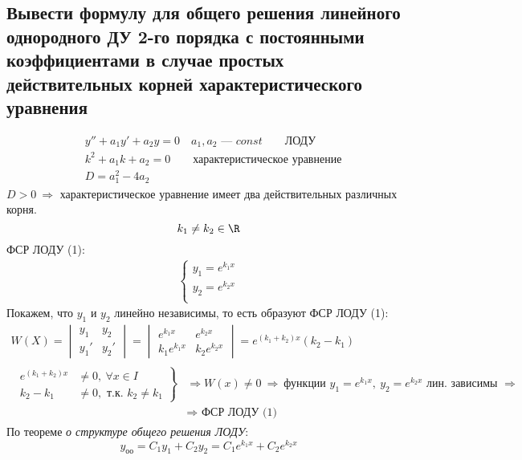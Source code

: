 \newpage
\subsection{Вывести формулу для общего решения линейного однородного ДУ 2-го порядка с постоянными коэффициентами в случае простых действительных корней характеристического уравнения}

\begin{align*}
    &\boxed{y'' + a_1 y' + a_2 y = 0}\quad a_1, a_2 \text{ --- } const\qquad \text{ЛОДУ} \tag{1} \\
    &\boxed{k^2 + a_1k + a_2 = 0}\qquad \text{характеристическое уравнение}\\
    &D = a_1^2 - 4a_2
\end{align*}
 $D > 0\ \Rightarrow$ характеристическое уравнение имеет два действительных различных корня.
\[
    k_1 \ne k_2 \in \R
\]
ФСР ЛОДУ (1): \vspace{-\topsep}
\begin{gather*}
    \left\{ \begin{aligned}
        y_1 = e^{k_1x} \\
        y_2 = e^{k_2x} \\
    \end{aligned} \right.
\end{gather*}
Покажем, что $y_1$ и $y_2$ линейно независимы, то есть образуют ФСР ЛОДУ (1):
\begin{gather*}
    W(X) = \begin{vmatrix}
        y_1 & y_2 \\
        y_1' & y_2' 
    \end{vmatrix} = \begin{vmatrix}
        e^{k_1x} & e^{k_2x} \\
        k_1e^{k_1x} & k_2e^{k_2x} 
    \end{vmatrix} = e^{(k_1 + k_2) x} (k_2 - k_1) \\
    \begin{aligned}
        \left. \begin{aligned}
            e^{(k_1 + k_2) x} &\ne 0,\ \forall x \in I \\
            k_2 - k_1 &\ne 0, \text{ т.к. } k_2 \ne k_1
        \end{aligned} \right\} &\Rightarrow W(x) \ne 0\ \Rightarrow\ \text{функции } y_1 = e^{k_1x},\ y_2  = e^{k_2x} \text{ лин. зависимы } \Rightarrow \\ 
        &\Rightarrow \text{ ФСР ЛОДУ (1)}
    \end{aligned}
\end{gather*}
По теореме \textit{о структуре общего решения ЛОДУ}:
\[
    y_{\text{оо}} = C_1y_1 + C_2y_2 = C_1 e^{k_1x} + C_2 e^{k_2x}
\]

